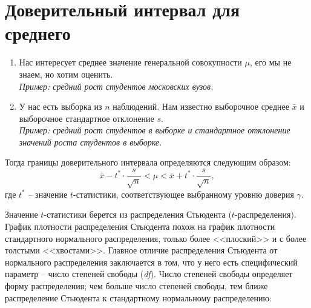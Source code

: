 \documentclass[a4paper,12pt]{extarticle}
\begin{document}
\section*{Доверительный интервал для среднего}
\begin{enumerate}
\item Нас интересует среднее значение генеральной совокупности 
$\mu$, его мы не знаем, но хотим оценить. \medskip\\
\textit{Пример: средний рост студентов московских вузов.}
\item У нас есть выборка из $n$ наблюдений. Нам известно 
выборочное среднее $\bar{x}$ и выборочное стандартное отклонение $s$.\medskip\\
\textit{Пример: средний рост студентов в выборке и стандартное 
отклонение значений роста студентов в выборке.}
\end{enumerate}

Тогда границы доверительного интервала определяются следующим образом:
$$
\bar{x} - t^* \cdot \frac{s}{\sqrt{n}}<\mu< \bar{x} + t^* \cdot \frac{s}{\sqrt{n}},
$$
где $t^*$ -- значение $t$-статистики, соответствующее выбранному 
уровню доверия $\gamma$.

Значение $t$-статистики берется из распределения Стьюдента 
($t$-распределения). График плотности распределения Стьюдента 
похож на график плотности стандартного нормального распределения, 
только более <<плоский>> и с более толстыми <<хвостами>>. 
Главное отличие распределения Стьюдента от нормального 
распределения заключается в том, что у него есть специфический 
параметр -- число степеней свободы (\textit{df}). Число степеней 
свободы определяет форму распределения; чем больше число 
степеней свободы, тем ближе распределение Стьюдента к 
стандартному нормальному распределению:
\begin{center}
\end{center}
\end{document}
